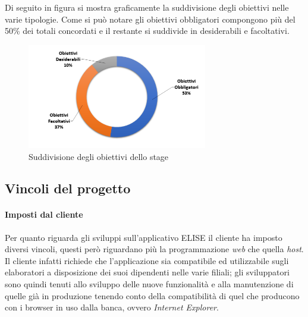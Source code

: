 \newpage

	Di seguito in figura si mostra graficamente la suddivisione degli obiettivi nelle varie tipologie. Come si può notare gli obiettivi obbligatori compongono più del 50\% dei totali concordati e il restante si suddivide in desiderabili e facoltativi.\\
	
	\begin{figure}[H]
		\centering
	   	\includegraphics[width=0.7\textwidth]{immagini/Percentuale_Obiettivi}
	   	\caption{Suddivisione degli obiettivi dello stage}
	\end{figure}

\subsection{Vincoli del progetto}
	
	\paragraph{Imposti dal cliente}
	\leavevmode	\newline
	\leavevmode	\newline
	Per quanto riguarda gli sviluppi sull'applicativo ELISE il cliente ha imposto diversi vincoli, questi però riguardano più la programmazione \textit{web} che quella \textit{host}.\\
	
	Il cliente infatti richiede che l'applicazione sia compatibile ed utilizzabile sugli elaboratori a disposizione dei suoi dipendenti nelle varie filiali; gli sviluppatori sono quindi tenuti allo sviluppo delle nuove funzionalità e alla manutenzione di quelle già in produzione tenendo conto della compatibilità di quel che producono con i browser in uso dalla banca, ovvero \textit{Internet Explorer}.\\
	

